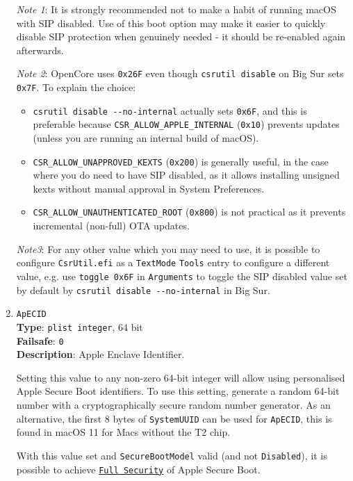 \documentclass[]{article}
\providecommand{\tightlist}{%
  \setlength{\itemsep}{0pt}\setlength{\parskip}{0pt}}
\begin{document}
\begin{enumerate}
  \emph{Note 1}: It is strongly recommended not to make a habit of running macOS with
  SIP disabled. Use of this boot option may make it easier to quickly disable SIP
  protection when genuinely needed - it should be re-enabled again afterwards.

  \emph{Note 2}: OpenCore uses \texttt{0x26F} even though \texttt{csrutil disable} on Big Sur
  sets \texttt{0x7F}. To explain the choice:
  \begin{itemize}
  \tightlist
  \item \texttt{csrutil disable -{}-no-internal} actually sets \texttt{0x6F}, and this is
  preferable because \texttt{CSR\_ALLOW\_APPLE\_INTERNAL} (\texttt{0x10}) prevents updates
  (unless you are running an internal build of macOS).
  \item \texttt{CSR\_ALLOW\_UNAPPROVED\_KEXTS} (\texttt{0x200}) is generally useful, in the case
  where you do need to have SIP disabled, as it allows installing unsigned kexts without manual
  approval in System Preferences.
  \item \texttt{CSR\_ALLOW\_UNAUTHENTICATED\_ROOT} (\texttt{0x800}) is not practical as it prevents
  incremental (non-full) OTA updates.
  \end{itemize}

  \emph{Note3}: For any other value which you may need to use, it is possible to
  configure \texttt{CsrUtil.efi} as a \texttt{TextMode} \texttt{Tools} entry to configure a
  different value, e.g. use \texttt{toggle\ 0x6F} in \texttt{Arguments} to toggle the
  SIP disabled value set by default by \texttt{csrutil disable -{}-no-internal} in Big Sur.

\item
  \texttt{ApECID}\\
  \textbf{Type}: \texttt{plist\ integer}, 64 bit\\
  \textbf{Failsafe}: \texttt{0}\\
  \textbf{Description}: Apple Enclave Identifier.

  Setting this value to any non-zero 64-bit integer will allow using
  personalised Apple Secure Boot identifiers. To use this setting,
  generate a random 64-bit number with a cryptographically secure
  random number generator. As an alternative, the first 8 bytes of \texttt{SystemUUID}
  can be used for \texttt{ApECID}, this is found in macOS 11 for Macs without
  the T2 chip.

  With this value set and \texttt{SecureBootModel} valid
  (and not \texttt{Disabled}), it is possible to achieve
  \href{https://support.apple.com/en-us/HT208330}{\texttt{Full Security}} of Apple
  Secure Boot.


\end{enumerate}
\end{document}
